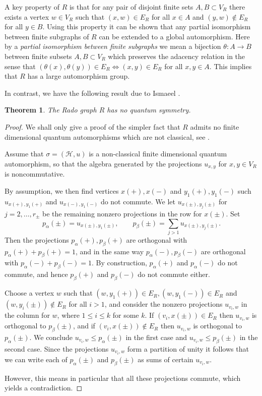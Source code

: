 \documentclass[a4paper]{amsart}
\newcommand*{\Hc}{\mathcal{H}}
\numberwithin{equation}{section}
\theoremstyle{change}
\newtheorem{theorem}{Theorem}[section]
\begin{document}
A key property of $ R $ is that for any pair of disjoint finite sets $ A,B \subset V_R $ there exists a vertex $ w \in V_R $ such that $ (x,w) \in E_R $ 
for all $ x \in A $ and $ (y,w) \notin E_R $ for all $ y \in B $. 
Using this property it can be shown that any partial isomorphism between finite subgraphs of $ R $ can be extended to a global automorphism. Here by a \emph{ partial isomorphism between finite subgraphs} we mean a bijection $ \theta: A \rightarrow B $ between finite subsets $ A,B \subset V_R $ which preserves the adacency relation in the sense that $ (\theta(x),\theta(y)) \in E_R \Leftrightarrow (x,y) \in E_R $ 
for all $ x,y \in A $. This implies that $ R $ has a large automorphism group.  

In contrast, we have the following result due to Ismaeel \cite{ISMAEEL_rado}.

\begin{theorem} \label{ER}
The Rado graph $ R $ has no quantum symmetry. 
\end{theorem} 

\begin{proof} 
We shall only give a proof of the simpler fact that $ R $ admits no finite dimensional quantum automorphisms which are not classical, see \cite[Proposition 7.15]{VOIGT_infinitequantumpermutations}. 

Assume that $ \sigma = (\Hc, u) $ is a non-classical finite dimensional quantum automorphism, so that the algebra generated by the projections $ u_{x, y} $ for $ x, y \in V_R $ is noncommutative. 

By assumption, we then find vertices $ x(+), x(-) $ and $ y_1(+), y_1(-) $ such $ u_{x(+), y_1(+)} $ and $ u_{x(-), y_1(-)} $ do not commute. 
We let $ u_{x(\pm), y_j(\pm)} $ for $ j = 2, \dots, r_\pm $ be the remaining nonzero projections in the row for $ x(\pm) $. Set 
$$
p_\alpha(\pm) = u_{x(\pm), y_1(\pm)}, \qquad p_\beta(\pm) = \sum_{j > 1} u_{x(\pm),y_j(\pm)}.  
$$
Then the projections $ p_\alpha(+), p_\beta(+) $ are orthogonal with $ p_\alpha(+) + p_\beta(+) = 1 $, 
and in the same way $ p_\alpha(-), p_\beta(-) $ are orthogonal with $ p_\alpha(-) + p_\beta(-) = 1 $. 
By construction, $ p_\alpha(+) $ and $ p_\alpha(-) $ do not commute, and hence $ p_\beta(+) $ and $ p_\beta(-) $ do not commute either. 

Choose a vertex $ w $ such that $ (w, y_1(+)) \in E_R, (w,y_1(-)) \in E_R $ and $ (w, y_i(\pm)) \notin E_R $ for all $ i > 1 $,
and consider the nonzero projections $ u_{v_i, w} $ in the column for $ w $, where $ 1 \leq i \leq k $ for some $ k $. 
If $ (v_i, x(\pm)) \in E_R $ then $ u_{v_i, w} $ is orthogonal to $ p_\beta(\pm) $, 
and if $ (v_i, x(\pm)) \notin E_R $ then $ u_{v_i, w} $ is orthogonal to $ p_\alpha(\pm) $. 
We conclude $ u_{v_i,w} \leq p_\alpha(\pm) $ in the first case and $ u_{v_i, w} \leq p_\beta(\pm) $ in the second case. 
Since the projections $ u_{v_i, w} $ form a partition of unity it follows that we can write each of $ p_\alpha(\pm) $ and $ p_\beta(\pm) $ as sums of certain $ u_{v_i, w} $. 

However, this means in particular that all these projections commute, which yields a contradiction. 
\end{proof} 
\end{document}
